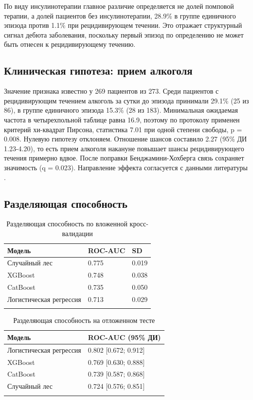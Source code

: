 \documentclass[pdflatex,sn-basic,Numbered]{sn-jnl}
\begin{document}
По виду инсулинотерапии главное различие определяется не долей помповой терапии, а долей пациентов без инсулинотерапии, 28.9\% в группе единичного эпизода против 1.1\% при рецидивирующем течении. Это отражает структурный сигнал дебюта заболевания, поскольку первый эпизод по определению не может быть отнесен к рецидивирующему течению.

\subsection{Клиническая гипотеза: прием алкоголя}\label{subsec3_2}

Значение признака известно у 269 пациентов из 273. Среди пациентов с рецидивирующим течением алкоголь за сутки до эпизода принимали 29.1\% (25 из 86), в группе единичного эпизода 15.3\% (28 из 183). Минимальная ожидаемая частота в четырехпольной таблице равна 16.9, поэтому по протоколу применен критерий хи-квадрат Пирсона, статистика 7.01 при одной степени свободы, p = 0.008. Нулевую гипотезу отклоняем. Отношение шансов составило 2.27 (95\% ДИ 1.23-4.20), то есть прием алкоголя накануне повышает шансы рецидивирующего течения примерно вдвое. После поправки Бенджамини-Хохберга связь сохраняет значимость (q = 0.023). Направление эффекта согласуется с данными литературы \cite{ref7,ref9,ref16}.

\subsection{Разделяющая способность}\label{subsec3_3}

\begin{table}[h]
\caption{Разделяющая способность по вложенной кросс-валидации}\label{tab2}%
\begin{tabular}{@{}lll@{}}
\toprule
Модель & ROC-AUC & SD\\
\midrule
Случайный лес & 0.775 & 0.019\\
XGBoost & 0.748 & 0.038\\
CatBoost & 0.735 & 0.050\\
Логистическая регрессия & 0.713 & 0.029\\
\botrule
\end{tabular}
\end{table}

\begin{table}[h]
\caption{Разделяющая способность на отложенном тесте}\label{tab3}%
\begin{tabular}{@{}ll@{}}
\toprule
Модель & ROC-AUC (95\% ДИ)\\
\midrule
Логистическая регрессия & 0.802 [0.672; 0.912]\\
XGBoost & 0.769 [0.630; 0.888]\\
CatBoost & 0.739 [0.587; 0.868]\\
Случайный лес & 0.724 [0.576; 0.851]\\
\botrule
\end{tabular}
\end{table}
\end{document}
